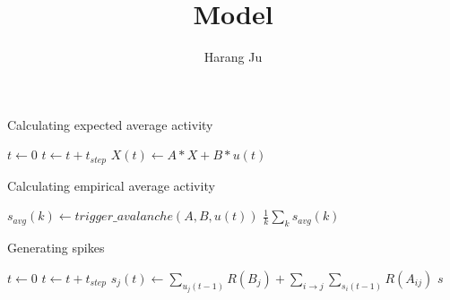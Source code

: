 \documentclass{article}
\begin{document}
\title{Model}
\author{Harang Ju}


\begin{algorithm}
\caption{Calculating expected average activity}
\begin{algorithmic}[1]
\State $t \gets 0$
\Repeat
\State $t \gets t + t_{step}$
\State $X(t) \gets A*X + B*u(t)$
\EndFunction
\end{algorithmic}
\end{algorithm}

\begin{algorithm}
\caption{Calculating empirical average activity}
\begin{algorithmic}[1]
\State $s_{avg}(k) \gets trigger\_avalanche(A,B,u(t))$
\EndFor
\State \Return $\frac{1}{k} \sum\limits_k s_{avg}(k)$
\EndFunction
\end{algorithmic}
\end{algorithm}

\begin{algorithm}
\caption{Generating spikes}
\begin{algorithmic}[1]
\State $t\gets 0$
\Repeat
\State $t\gets t + t_{step}$
	\State $s_j(t) \gets \sum\limits_{u_j(t-1)} R(B_j) + \sum\limits_{i \rightarrow j} \sum\limits_{s_{i}(t-1)} R(A_{ij}) $ 
	\EndFor
{}
\State \Return $s$
\EndFunction
\State {}
\State {}
\end{algorithmic}
\end{algorithm}
\end{document}
